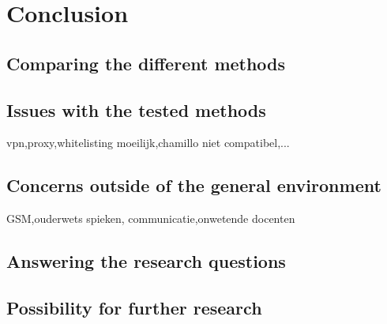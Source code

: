 
\chapter{Conclusion}
\label{ch:conclusie}


\section{Comparing the different methods}
\section{Issues with the tested methods}
vpn,proxy,whitelisting moeilijk,chamillo niet compatibel,...
\section{Concerns outside of the general environment}
GSM,ouderwets spieken, communicatie,onwetende docenten
\section{Answering the research questions}
\section{Possibility for further research}
